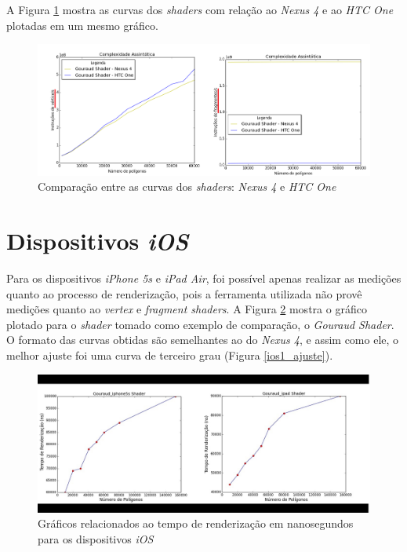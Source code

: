 	A Figura \ref{nexus_htc} mostra as curvas dos \textit{shaders} com relação ao \textit{Nexus 4} e ao \textit{HTC One} plotadas em um mesmo gráfico.	

	\begin{figure}[ht]
	\centering
		\includegraphics[keepaspectratio=true,scale=0.4]{figuras/nexus_htc.png}
	\caption{Comparação entre as curvas dos \textit{shaders}: \textit{Nexus 4} e \textit{HTC One}}
	\label{nexus_htc}
	\end{figure}	

\section{Dispositivos \textit{iOS}} 

	Para os dispositivos \textit{iPhone 5s} e \textit{iPad Air}, foi possível apenas realizar as medições quanto ao processo de renderização, pois a ferramenta utilizada não provê medições quanto ao \textit{vertex} e \textit{fragment shaders}.  A Figura \ref{ios1} mostra o gráfico plotado para o \textit{shader} tomado como exemplo de comparação, o \textit{Gouraud Shader}. O formato das curvas obtidas são semelhantes ao do \textit{Nexus 4}, e assim como ele, o melhor ajuste foi uma curva de terceiro grau (Figura \ref{ios1_ajuste}). 

	\begin{figure}[ht]
	\centering
		\includegraphics[keepaspectratio=true,scale=0.35]{figuras/ios_render_time_pt.jpg}
	\caption{Gráficos relacionados ao tempo de renderização em nanosegundos para os dispositivos \textit{iOS}}
	\label{ios1}
	\end{figure}	

